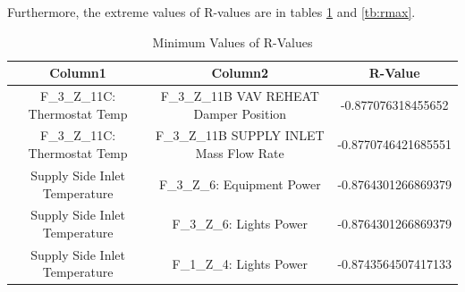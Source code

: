 \documentclass[aps, 10pt, a4paper]{article}
\begin{document}
                Furthermore, the extreme values of R-values are in tables \ref{tb:rmin} and \ref{tb:rmax}.
                
                \begin{table}[htbp]
                    \centering
                    \caption{Minimum Values of R-Values}
                    \label{tb:rmin}
                    \begin{tabular}{c|c||c}
                        Column1 & Column2 & R-Value \\ \hline
                        F\_3\_Z\_11C: Thermostat Temp & F\_3\_Z\_11B VAV REHEAT Damper Position & -0.877076318455652 \\
                        F\_3\_Z\_11C: Thermostat Temp & F\_3\_Z\_11B SUPPLY INLET Mass Flow Rate & -0.8770746421685551 \\
                        Supply Side Inlet Temperature & F\_3\_Z\_6: Equipment Power & -0.8764301266869379 \\
                        Supply Side Inlet Temperature & F\_3\_Z\_6: Lights Power & -0.8764301266869379 \\
                        Supply Side Inlet Temperature & F\_1\_Z\_4: Lights Power & -0.8743564507417133 \\
                    \end{tabular}
                \end{table}
            
\end{document}
